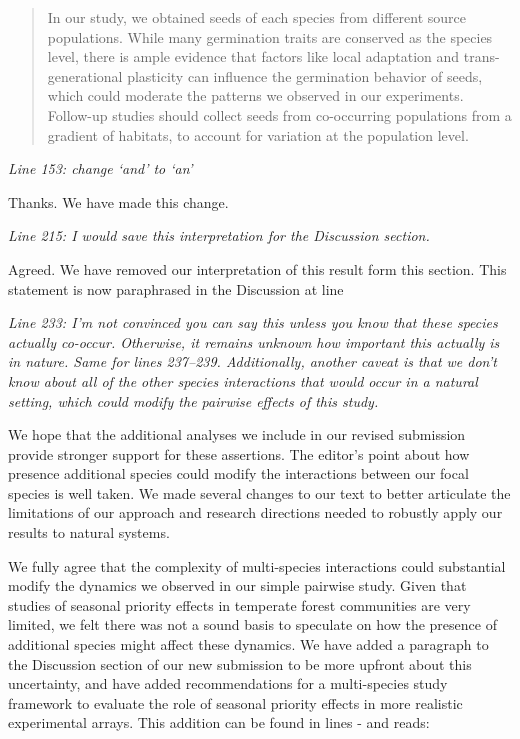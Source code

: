 \documentclass[11pt]{article}
\begin{document}
\begin{quote}In our study, we obtained seeds of each species from different source populations. While many germination traits are conserved as the species level, there is ample evidence that factors like local adaptation and trans-generational plasticity can influence the germination behavior of seeds, which could moderate the patterns we observed in our experiments. Follow-up studies should collect seeds from co-occurring populations from a gradient of habitats, to account for variation at the population level.\end{quote}

\emph{Line 153: change ‘and’ to ‘an’}

Thanks. We have made this change.

\emph{Line 215: I would save this interpretation for the Discussion section.}

Agreed. We have removed our interpretation of this result form this section. This statement is now paraphrased in the Discussion at line 

\emph{Line 233:  I’m not convinced you can say this unless you know that these species actually co-occur. Otherwise, it remains unknown how important this actually is in nature. Same for lines 237–239. Additionally, another caveat is that we don’t know about all of the other species interactions that would occur in a natural setting, which could modify the pairwise effects of this study.}

We hope that the additional analyses we include in our revised submission provide stronger support for these assertions. The editor's point about how presence additional species could modify the interactions between our focal species is well taken. We made several changes to our text to better articulate the limitations of our approach and research directions needed to robustly apply our results to natural systems.

We fully agree that the complexity of multi-species interactions could substantial modify the dynamics we observed in our simple pairwise study. Given that studies of seasonal priority effects in temperate forest communities are very limited, we felt there was not a sound basis to speculate on how the presence of additional species might affect these dynamics. We have added a paragraph to the Discussion section of our new submission to be more upfront about this uncertainty, and have added recommendations for a multi-species study framework to evaluate the role of seasonal priority effects in more realistic experimental arrays. This addition can be found in lines - and reads:
\end{document}
